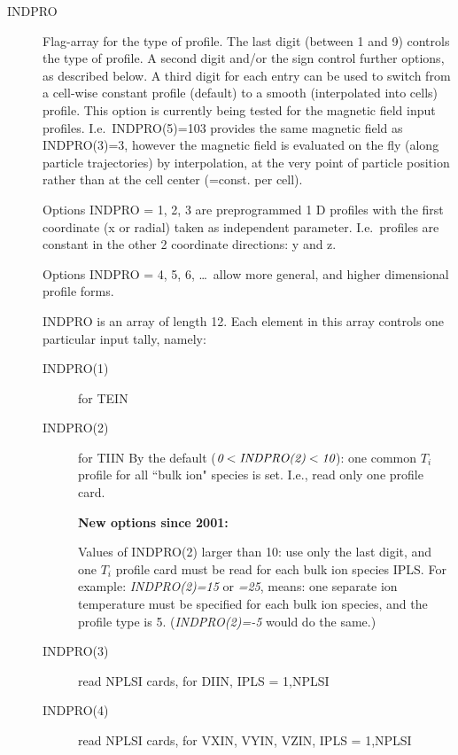 \begin{description}
  \item[INDPRO] Flag-array for the type of profile.
        The last digit (between 1 and 9) controls the type of profile.
        A second digit and/or the sign control further options, as described below.
        A third digit for each entry can be used to switch from a cell-wise constant
        profile (default) to a smooth (interpolated into cells) profile.
        This option is currently being tested for the magnetic field input profiles.
        I.e.\ INDPRO(5)=103 provides the same magnetic field as INDPRO(3)=3, however
        the magnetic field is evaluated on the fly (along particle trajectories) by
        interpolation, at the very point of particle position rather than at the cell
        center (=const.
        per cell).

        Options INDPRO = 1, 2, 3 are preprogrammed 1 D profiles with the first
        coordinate (x or radial) taken as independent parameter.
        I.e.\ profiles are constant in the other 2 coordinate directions: y and z.

        Options INDPRO = 4, 5, 6, \dots\ allow more general, and higher dimensional
        profile forms.

        INDPRO is an array of length 12.
        Each element in this array controls one particular input tally, namely:
        \begin{description}
          \item[INDPRO(1)]  for TEIN

          \item[INDPRO(2)]  for TIIN By the default ($\emph{0} < \emph{INDPRO(2)} <
                  \emph{10}$): one common $T_i$ profile for all ``bulk ion" species is set.
                I.e., read only one profile card.

                \textbf{New options since 2001:}

                Values of INDPRO(2) larger than 10: use only the last digit, and one $T_i$
                profile card must be read for each bulk ion species IPLS.
                For example: \emph{INDPRO(2)=15} or \emph{=25}, means: one separate ion
                temperature must be specified for each bulk ion species, and the profile type
                is 5.
                (\emph{INDPRO(2)=-5} would do the same.)
          \item[INDPRO(3)] read NPLSI cards, for DIIN, IPLS = 1,NPLSI

          \item[INDPRO(4)] read NPLSI cards, for VXIN, VYIN, VZIN, IPLS = 1,NPLSI


\end{description}
\end{description}
